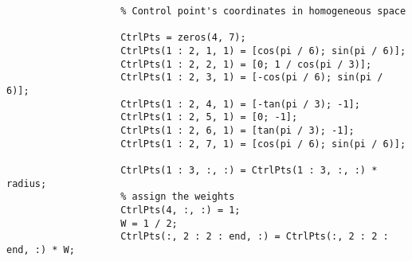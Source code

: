 \begin{itemize}
\begin{itemize}
\begin{lstlisting}
                    % Control point's coordinates in homogeneous space

                    CtrlPts = zeros(4, 7);
                    CtrlPts(1 : 2, 1, 1) = [cos(pi / 6); sin(pi / 6)];
                    CtrlPts(1 : 2, 2, 1) = [0; 1 / cos(pi / 3)];
                    CtrlPts(1 : 2, 3, 1) = [-cos(pi / 6); sin(pi / 6)];
                    CtrlPts(1 : 2, 4, 1) = [-tan(pi / 3); -1];
                    CtrlPts(1 : 2, 5, 1) = [0; -1];
                    CtrlPts(1 : 2, 6, 1) = [tan(pi / 3); -1];
                    CtrlPts(1 : 2, 7, 1) = [cos(pi / 6); sin(pi / 6)];

                    CtrlPts(1 : 3, :, :) = CtrlPts(1 : 3, :, :) * radius;
                    % assign the weights
                    CtrlPts(4, :, :) = 1;
                    W = 1 / 2;
                    CtrlPts(:, 2 : 2 : end, :) = CtrlPts(:, 2 : 2 : end, :) * W;
                \end{lstlisting}


\end{itemize}
\end{itemize}
